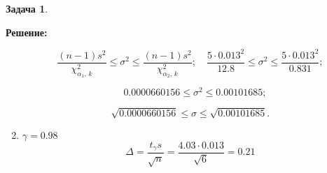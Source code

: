 \documentclass[a4paper,11pt]{article}
\newenvironment{shdd}{\begin{mdframed}[backgroundcolor=shadecolor]}{\end{mdframed}}
\theoremstyle{definition}
\newtheorem{problem}{Задача}\setlength{\parindent}{0pt}
\newenvironment{solution}
{\begin{shdd}\textbf{Решение:}\par\setlength{\parindent}{0pt}}
{\end{shdd}}
\newenvironment{answer}
{\par\noindent\textbf{Ответ:}}
{\par}
\begin{document}
\begin{problem}
\begin{solution}
\begin{enumerate}
                         \[
                         \frac{(n-1)s^2}{\chi^2_{\alpha_1, \, k}} \leq \sigma^2 \leq \frac{(n-1)s^2}{\chi^2_{\alpha_2, \, k}}; 
                         \quad\frac{5\cdot 0.013^2}{12.8} \leq \sigma^2 \leq \frac{5\cdot 0.013^2}{0.831};
                         \]
                         
                         \[
                         \quad 0.0000660156 \leq\sigma^2 \leq 0.00101685; 
                         \]
                         
                         \[
                         \sqrt{0.0000660156} \leq\sigma \leq \sqrt{0.00101685}.
                         \]
        
            \item \(\gamma=0.98\)
                  \[\Delta = \frac{t_{\gamma}s}{\sqrt{n}} = \frac{4.03\cdot 0.013}{\sqrt{6}} = 0.21\]
        \end{enumerate}
    \end{solution}


\end{problem}
\end{document}
